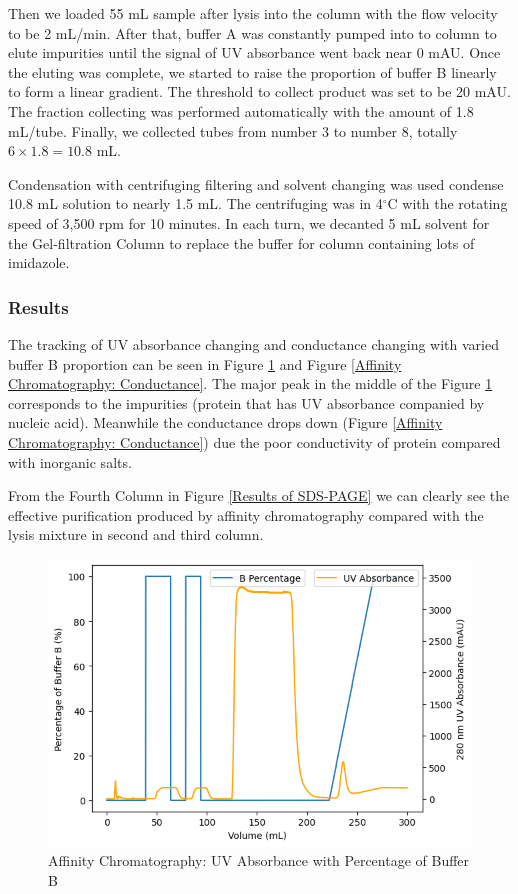 \documentclass{report}
\begin{document}
Then we loaded 55 mL sample after lysis into the column with the flow velocity to be 2 mL/min.
After that, buffer A was constantly pumped into to column to elute impurities until the signal of UV absorbance went back near 0 mAU.
Once the eluting was complete, we started to raise the proportion of buffer B linearly to form a linear gradient.
The threshold to collect product was set to be 20 mAU.
The fraction collecting was performed automatically with the amount of 1.8 mL/tube.
Finally, we collected tubes from number 3 to number 8, totally $6\times1.8=10.8$ mL.

Condensation with centrifuging filtering and solvent changing was used condense 10.8 mL solution to nearly 1.5 mL.
The centrifuging was in 4$^\circ$C with the rotating speed of 3,500 rpm for 10 minutes.
In each turn, we decanted 5 mL solvent for the Gel-filtration Column to replace the buffer for  column containing lots of imidazole.

\subsubsection{Results}
The tracking of UV absorbance changing and conductance changing with varied buffer B proportion can be seen in Figure \ref{Affinity Chromatography: UV Absorbance} and Figure \ref{Affinity Chromatography: Conductance}.
The major peak in the middle of the Figure \ref{Affinity Chromatography: UV Absorbance} corresponds to the impurities (protein that has UV absorbance companied by nucleic acid).
Meanwhile the conductance drops down (Figure \ref{Affinity Chromatography: Conductance}) due the poor conductivity of protein compared with inorganic salts.

From the Fourth Column in Figure \ref{Results of SDS-PAGE} we can clearly see the effective purification produced by affinity chromatography compared with the lysis mixture in second and third column.

\begin{figure}
    \centering
    \includegraphics[width=0.6\linewidth]{../Figures/Affinity Column UV.png}
    \caption{Affinity Chromatography: UV Absorbance with Percentage of Buffer B}
    \label{Affinity Chromatography: UV Absorbance}
\end{figure}
\end{document}
